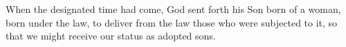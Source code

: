 
\lettrine{W}{}hen the designated time had come, God sent forth his Son born of a woman, born under the law, to deliver from the law those who were subjected to it, so that we might receive our status as adopted sons.